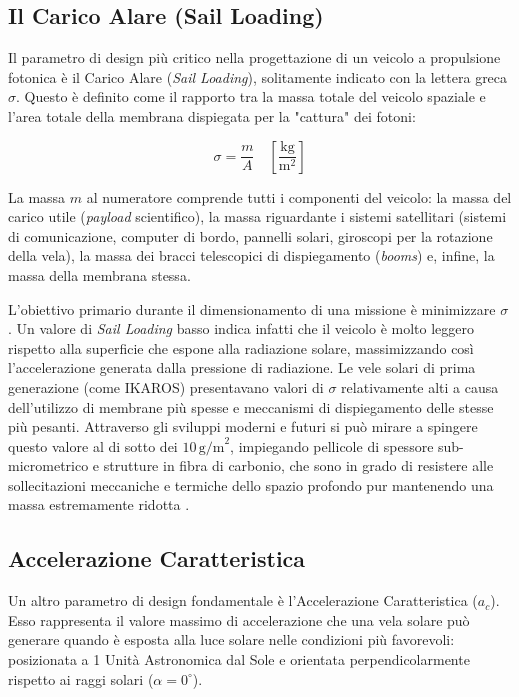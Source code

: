 
\subsection{Il Carico Alare (Sail Loading)}
Il parametro di design più critico nella progettazione di un veicolo a propulsione fotonica è il Carico Alare (\textit{Sail Loading}), solitamente indicato con la lettera greca $\sigma$. Questo è definito come il rapporto tra la massa totale del veicolo spaziale e l'area totale della membrana dispiegata per la "cattura" dei fotoni:

\begin{equation} \label{eq:sail_loading}
    \sigma = \frac{m}{A} \quad \left[ \frac{\text{kg}}{\text{m}^2} \right]
\end{equation}

La massa $m$ al numeratore comprende tutti i componenti del veicolo: la massa del carico utile (\textit{payload} scientifico), la massa riguardante i sistemi satellitari (sistemi di comunicazione, computer di bordo, pannelli solari, giroscopi per la rotazione della vela), la massa dei bracci telescopici di dispiegamento (\textit{booms}) e, infine, la massa della membrana stessa.

L'obiettivo primario durante il dimensionamento di una missione è minimizzare $\sigma$. Un valore di \textit{Sail Loading} basso indica infatti che il veicolo è molto leggero rispetto alla superficie che espone alla radiazione solare, massimizzando così l'accelerazione generata dalla pressione di radiazione.
Le vele solari di prima generazione (come IKAROS) presentavano valori di $\sigma$ relativamente alti a causa dell'utilizzo di membrane più spesse e meccanismi di dispiegamento delle stesse più pesanti. Attraverso gli sviluppi moderni e futuri si può mirare a spingere questo valore al di sotto dei $10 \, \text{g/m}^2$, impiegando pellicole di spessore sub-micrometrico e strutture in fibra di carbonio, che sono in grado di resistere alle sollecitazioni meccaniche e termiche dello spazio profondo pur mantenendo una massa estremamente ridotta \cite{rodrigues2023review, johnson2012status, johnson2009future}.


\subsection{Accelerazione Caratteristica}
Un altro parametro di design fondamentale è l'Accelerazione Caratteristica ($a_c$). Esso rappresenta il valore massimo di accelerazione che una vela solare può generare quando è esposta alla luce solare nelle condizioni più favorevoli: posizionata a 1 Unità Astronomica dal Sole e orientata perpendicolarmente rispetto ai raggi solari ($\alpha = 0^\circ$).

